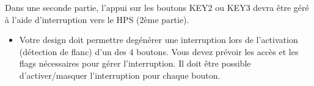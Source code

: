 Dans une seconde partie, l’appui sur les boutons KEY2 ou KEY3 devra être géré à l'aide d'interruption vers le HPS (2ème partie).\\

\begin{itemize}
	\item Votre  design  doit  permettre  degénérer  une  interruption  lors  de  l'activation (détection de flanc) d'un des 4 boutons. Vous devez prévoir les accès et les flags nécessaires   pour   gérer   l'interruption.   Il   doit   être   possible   d'activer/masquer l'interruption pour chaque bouton.\\
\end{itemize}
